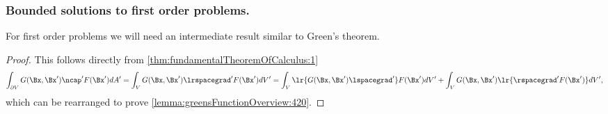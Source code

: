 \subsubsection{Bounded solutions to first order problems.}

For first order problems we will need an intermediate result similar to Green's theorem.

\begin{proof}
This follows directly from \cref{thm:fundamentalTheoremOfCalculus:1}
\begin{dmath}\label{eqn:greensFunctionSolutions:440}
\int_{\partial V} G(\Bx, \Bx') \ncap' F(\Bx') dA'
=
\int_V G(\Bx, \Bx') \lrspacegrad' F(\Bx') dV'
=
\int_V \lr{ G(\Bx, \Bx') \lspacegrad' } F(\Bx') dV'
+
\int_V G(\Bx, \Bx') \lr{ \rspacegrad' F(\Bx') } dV',
\end{dmath}
which can be rearranged to prove \cref{lemma:greensFunctionOverview:420}.
\end{proof}
